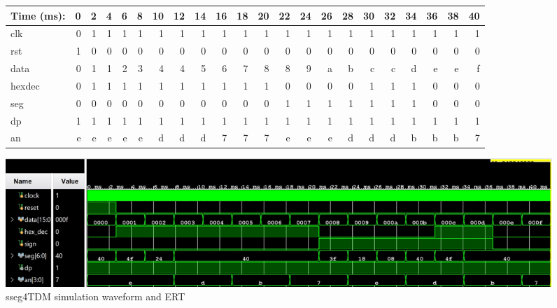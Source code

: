 \documentclass[11pt]{article}
\begin{document}
\begin{figure}[ht]\centering
	\begin{tabular}{l|rrrrrrrrrrrrrrrrrrrrr}
		Time (ms): & 0 & 2 & 4 & 6 & 8  & 10 & 12 & 14 & 16 & 18 & 20 & 22 & 24 & 26 & 28  & 30 & 32 & 34 & 36 & 38 & 40  \\
		\midrule
		clk & 0 & 1 & 1 & 1 & 1 & 1 & 1 & 1 & 1 & 1 & 1 & 1 & 1 & 1 & 1 & 1 & 1 & 1 & 1 & 1 & 1 \\
		rst & 1 & 0 & 0 & 0 & 0 & 0 & 0 & 0 & 0 & 0 & 0 & 0 & 0 & 0 & 0 & 0 & 0 & 0 & 0 & 0 & 0 \\
		data & 0 & 1 & 1 & 2 & 3 & 4 & 4 & 5 & 6 & 7 & 8 & 8 & 9 & a & b & c & c & d & e & e & f\\
		hexdec & 0 & 1 & 1 & 1 & 1 & 1 & 1 & 1 & 1 & 1 & 1 & 0 & 0 & 0 & 0 & 1 & 1 & 1 & 0 & 0 & 0 \\
		\midrule
		seg & 0 & 0 & 0 & 0 & 0 & 0 & 0 & 0 & 0 & 0 & 0 & 1 & 1 & 1 & 1 & 1 & 1 & 1 & 0 & 0 & 0\\
		dp & 1 & 1 & 1 & 1 & 1 & 1 & 1 & 1 & 1 & 1 & 1 & 1 & 1 & 1 & 1 & 1 & 1 & 1 & 1 & 1 & 1\\
		an & e & e & e & e & e & d & d & d & 7 & 7 & 7 & e & e & e & d & d & d & b & b & b & 7\\
		\bottomrule
	\end{tabular}\medskip
	
	\includegraphics[width=1.15 \textwidth]{sseg4_TDM_Test.JPG}
	\caption{sseg4TDM simulation waveform and ERT}
	\label{fig:sim_with_table}
\end{figure}
\end{document}
